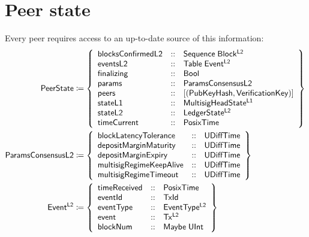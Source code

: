 \documentclass[../hydrozoa.tex]{subfiles}
\begin{document}
\section{Peer state}%
\label{h:l2-peer-state}%

Every peer requires access to an up-to-date source of this information:
\begin{equation*}
\begin{split}
  \peerStateTypeName{} &\coloneq \peerStateTypeBody{} \\
  \paramsConsensusTypeName{} &\coloneq \paramsConsensusTypeBody{} \\
  \T{Event^{L2}} &\coloneq \left\{
    \begin{array}{lll}
      \T{timeReceived} &::& \T{PosixTime} \\
      \T{eventId} &::& \T{TxId} \\
      \T{eventType} &::& \T{EventType^{L2}} \\
      \T{event} &::& \T{Tx^{L2}} \\
      \T{blockNum} &::& \T{Maybe} \; \T{UInt}
    \end{array}\right\} \\
\end{split}
\end{equation*}
\end{document}
